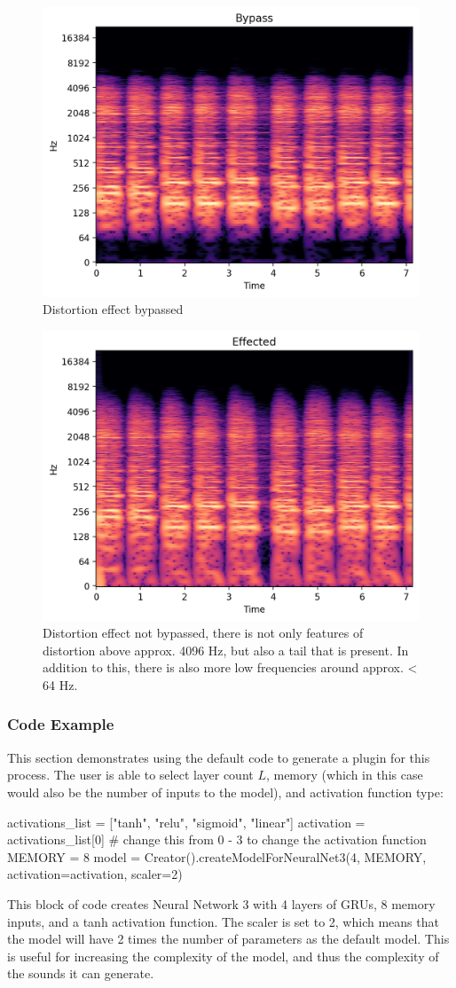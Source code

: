 \documentclass{article}
\begin{document}
\begin{figure}
	\centering
	\includegraphics[width=0.5\columnwidth]{images/nn3_bypass.png}

	\caption{Distortion effect bypassed}
	\label{fig:neuralnet31}
\end{figure}

\begin{figure}
	\centering

	\includegraphics[width=0.5\columnwidth]{images/nn3_effected.png}

	\caption{Distortion effect not bypassed, there is not only features of distortion above approx. 4096 Hz, but also a tail that is present. In addition to this, there is also more low frequencies around approx. < 64 Hz.}
	\label{fig:neuralnet32}
\end{figure}

\newpage
\subsubsection{Code Example}
This section demonstrates using the default code to generate a plugin for this process. The user is able to select layer count $L$, memory (which in this case would also be the number of inputs to the model), and activation function type:
\begin{ffcode}
	activations_list = ["tanh", "relu", "sigmoid", "linear"]
	activation = activations_list[0]
	# change this from 0 - 3 to change the activation function
	MEMORY = 8
	model = Creator().createModelForNeuralNet3(4, MEMORY, activation=activation, scaler=2)
\end{ffcode}
This block of code creates Neural Network 3 with 4 layers of GRUs, 8 memory inputs, and a tanh activation function. The scaler is set to 2, which means that the model will have 2 times the number of parameters as the default model. This is useful for increasing the complexity of the model, and thus the complexity of the sounds it can generate.
\end{document}
